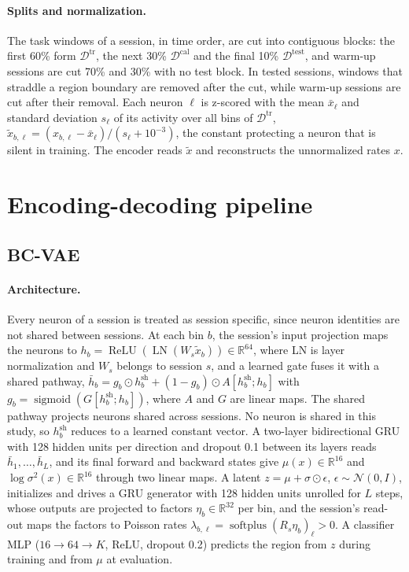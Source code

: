 \documentclass{article}
\begin{document}
\paragraph{Splits and normalization.} The task windows of a session, in time order, are cut into contiguous blocks: the first 60\% form $\mathcal{D}^{\mathrm{tr}}$, the next 30\% $\mathcal{D}^{\mathrm{cal}}$ and the final 10\% $\mathcal{D}^{\mathrm{test}}$, and warm-up sessions are cut 70\% and 30\% with no test block. In tested sessions, windows that straddle a region boundary are removed after the cut, while warm-up sessions are cut after their removal. Each neuron $\ell$ is z-scored with the mean $\bar x_\ell$ and standard deviation $s_\ell$ of its activity over all bins of $\mathcal{D}^{\mathrm{tr}}$, $\tilde x_{b,\ell}=(x_{b,\ell}-\bar x_\ell)/(s_\ell+10^{-3})$, the constant protecting a neuron that is silent in training. The encoder reads $\tilde x$ and reconstructs the unnormalized rates $x$.

\section{Encoding-decoding pipeline}
\label{app:pipeline}

\subsection{BC-VAE}
\paragraph{Architecture.} Every neuron of a session is treated as session specific, since neuron identities are not shared between sessions. At each bin $b$, the session's input projection maps the neurons to $h_b=\operatorname{ReLU}(\operatorname{LN}(W_s\tilde x_b))\in\mathbb{R}^{64}$, where LN is layer normalization and $W_s$ belongs to session $s$, and a learned gate fuses it with a shared pathway, $\bar h_b=g_b\odot h^{\mathrm{sh}}_b+(1-g_b)\odot A[h^{\mathrm{sh}}_b;h_b]$ with $g_b=\operatorname{sigmoid}(G[h^{\mathrm{sh}}_b;h_b])$, where $A$ and $G$ are linear maps. The shared pathway projects neurons shared across sessions. No neuron is shared in this study, so $h^{\mathrm{sh}}_b$ reduces to a learned constant vector. A two-layer bidirectional GRU with 128 hidden units per direction and dropout 0.1 between its layers reads $\bar h_1,\ldots,\bar h_L$, and its final forward and backward states give $\mu(x)\in\mathbb{R}^{16}$ and $\log\sigma^2(x)\in\mathbb{R}^{16}$ through two linear maps. A latent $z=\mu+\sigma\odot\epsilon$, $\epsilon\sim\mathcal{N}(0,I)$, initializes and drives a GRU generator with 128 hidden units unrolled for $L$ steps, whose outputs are projected to factors $\eta_b\in\mathbb{R}^{32}$ per bin, and the session's read-out maps the factors to Poisson rates $\lambda_{b,\ell}=\operatorname{softplus}(R_s \eta_b)_\ell>0$. A classifier MLP ($16\to64\to K$, ReLU, dropout 0.2) predicts the region from $z$ during training and from $\mu$ at evaluation.
\end{document}
